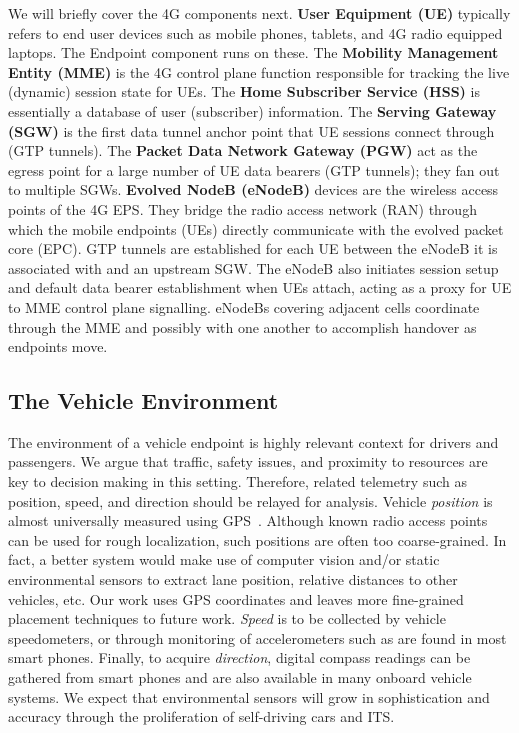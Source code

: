 We will briefly cover the 4G components next. \textbf{User Equipment
  (UE)} typically refers to end user devices such as mobile phones,
tablets, and 4G radio equipped laptops. The \name{} Endpoint component
runs on these. The \textbf{Mobility Management Entity (MME)} is the 4G
control plane function responsible for tracking the live (dynamic)
session state for UEs. The \textbf{Home Subscriber Service (HSS)} is
essentially a database of user (subscriber) information. The
\textbf{Serving Gateway (SGW)} is the first data tunnel anchor point
that UE sessions connect through (GTP tunnels). The \textbf{Packet
  Data Network Gateway (PGW)} act as the egress point for a large
number of UE data bearers (GTP tunnels); they fan out to multiple
SGWs.  \textbf{Evolved NodeB (eNodeB)} devices are the wireless access
points of the 4G EPS. They bridge the radio access network (RAN)
through which the mobile endpoints (UEs) directly communicate with the
evolved packet core (EPC). GTP tunnels are established for each UE
between the eNodeB it is associated with and an upstream SGW.  The
eNodeB also initiates session setup and default data bearer
establishment when UEs attach, acting as a proxy for UE to MME
control plane signalling. eNodeBs covering adjacent cells coordinate
through the MME and possibly with one another to accomplish handover
as endpoints move.

\subsection{The Vehicle Environment}

The environment of a vehicle endpoint is highly relevant context for
drivers and passengers. We argue that traffic, safety issues, and
proximity to resources are key to decision making in this
setting. Therefore, related telemetry such as position, speed, and
direction should be relayed for analysis. Vehicle \emph{position} is
almost universally measured using GPS~\cite{misra2006global}.
Although known radio access points can be used for rough localization,
such positions are often too coarse-grained.  In fact, a better system
would make use of computer vision and/or static environmental sensors
to extract lane position, relative distances to other vehicles, etc.
Our work uses GPS coordinates and leaves more fine-grained placement
techniques to future work. \emph{Speed} is to be collected by vehicle
speedometers, or through monitoring of accelerometers such as are
found in most smart phones. Finally, to acquire \emph{direction},
digital compass readings can be gathered from smart phones and are
also available in many onboard vehicle systems.  We expect that
environmental sensors will grow in sophistication and accuracy through
the proliferation of self-driving cars and ITS.
